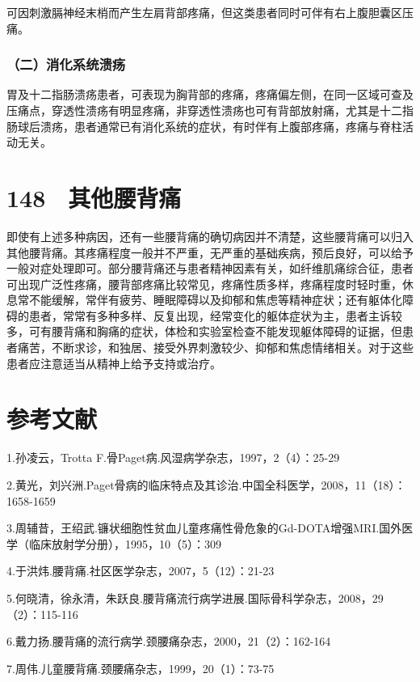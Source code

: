 可因刺激膈神经末梢而产生左肩背部疼痛，但这类患者同时可伴有右上腹胆囊区压痛。

\subsubsection{（二）消化系统溃疡}

胃及十二指肠溃疡患者，可表现为胸背部的疼痛，疼痛偏左侧，在同一区域可查及压痛点，穿透性溃疡有明显疼痛，非穿透性溃疡也可有背部放射痛，尤其是十二指肠球后溃疡，患者通常已有消化系统的症状，有时伴有上腹部疼痛，疼痛与脊柱活动无关。

\protect\hypertarget{text00336.html}{}{}

\section{148　其他腰背痛}

即使有上述多种病因，还有一些腰背痛的确切病因并不清楚，这些腰背痛可以归入其他腰背痛。其疼痛程度一般并不严重，无严重的基础疾病，预后良好，可以给予一般对症处理即可。部分腰背痛还与患者精神因素有关，如纤维肌痛综合征，患者可出现广泛性疼痛，腰背部疼痛比较常见，疼痛性质多样，疼痛程度时轻时重，休息常不能缓解，常伴有疲劳、睡眠障碍以及抑郁和焦虑等精神症状；还有躯体化障碍的患者，常常有多种多样、反复出现，经常变化的躯体症状为主，患者主诉较多，可有腰背痛和胸痛的症状，体检和实验室检查不能发现躯体障碍的证据，但患者痛苦，不断求诊，和独居、接受外界刺激较少、抑郁和焦虑情绪相关。对于这些患者应注意适当从精神上给予支持或治疗。

\protect\hypertarget{text00337.html}{}{}

\section{参考文献}

1.孙凌云，Trotta F.骨Paget病.风湿病学杂志，1997，2（4）：25-29

2.黄光，刘兴洲.Paget骨病的临床特点及其诊治.中国全科医学，2008，11（18）：1658-1659

3.周辅昔，王绍武.镰状细胞性贫血儿童疼痛性骨危象的Gd-DOTA增强MRI.国外医学（临床放射学分册），1995，10（5）：309

4.于洪炜.腰背痛.社区医学杂志，2007，5（12）：21-23

5.何晓清，徐永清，朱跃良.腰背痛流行病学进展.国际骨科学杂志，2008，29（2）：115-116

6.戴力扬.腰背痛的流行病学.颈腰痛杂志，2000，21（2）：162-164

7.周伟.儿童腰背痛.颈腰痛杂志，1999，20（1）：73-75

